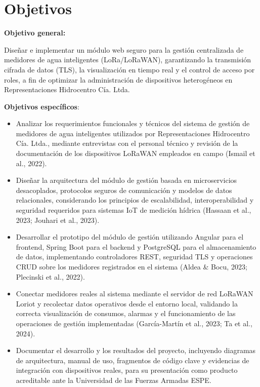 \documentclass[12pt,a4paper,oneside]{report}
\begin{document}
\section{\texorpdfstring{Objetivos }{Objetivos }}\label{objetivos}

\textbf{Objetivo general:}

Diseñar e implementar un módulo web seguro para la gestión centralizada de medidores de agua inteligentes (LoRa/LoRaWAN), garantizando la transmisión cifrada de datos (TLS), la visualización en tiempo real y el control de acceso por roles, a fin de optimizar la administración de dispositivos heterogéneos en Representaciones Hidrocentro Cía. Ltda.

\textbf{Objetivos específicos}:

\begin{itemize}
\item
  Analizar los requerimientos funcionales y técnicos del sistema de gestión de medidores de agua inteligentes utilizados por Representaciones Hidrocentro Cía. Ltda., mediante entrevistas con el personal técnico y revisión de la documentación de los dispositivos LoRaWAN empleados en campo (Ismail et al., 2022).
\item
  Diseñar la arquitectura del módulo de gestión basada en microservicios desacoplados, protocolos seguros de comunicación y modelos de datos relacionales, considerando los principios de escalabilidad, interoperabilidad y seguridad requeridos para sistemas IoT de medición hídrica (Hassaan et al., 2023; Jouhari et al., 2023).
\item
  Desarrollar el prototipo del módulo de gestión utilizando Angular para el frontend, Spring Boot para el backend y PostgreSQL para el almacenamiento de datos, implementando controladores REST, seguridad TLS y operaciones CRUD sobre los medidores registrados en el sistema (Aldea \& Bocu, 2023; Plecinski et al., 2022).
\item
  Conectar medidores reales al sistema mediante el servidor de red LoRaWAN Loriot y recolectar datos operativos desde el entorno local, validando la correcta visualización de consumos, alarmas y el funcionamiento de las operaciones de gestión implementadas (García-Martín et al., 2023; Ta et al., 2024).
\item
  Documentar el desarrollo y los resultados del proyecto, incluyendo diagramas de arquitectura, manual de uso, fragmentos de código clave y evidencias de integración con dispositivos reales, para su presentación como producto acreditable ante la Universidad de las Fuerzas Armadas ESPE.
\end{itemize}
\end{document}
